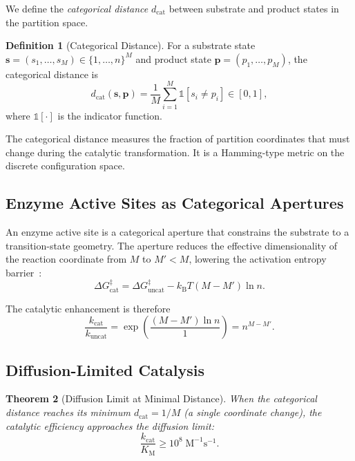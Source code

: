 \documentclass[10pt,twocolumn]{article}
\newtheorem{theorem}{Theorem}[section]
\theoremstyle{definition}
\newtheorem{definition}[theorem]{Definition}
\theoremstyle{remark}
\newcommand{\kB}{k_{\mathrm{B}}}
\newcommand{\dcat}{d_{\mathrm{cat}}}
\newcommand{\kuncat}{k_{\mathrm{uncat}}}
\newcommand{\kcat}{k_{\mathrm{cat}}}
\newcommand{\KM}{K_{\mathrm{M}}}
\begin{document}
We define the \emph{categorical distance} $\dcat$ between
substrate and product states in the partition space.

\begin{definition}[Categorical Distance]\label{def:dcat}
For a substrate state $\mathbf{s} = (s_1, \ldots, s_M) \in
\{1,\ldots,n\}^M$ and product state $\mathbf{p} = (p_1, \ldots, p_M)$,
the categorical distance is
\begin{equation}\label{eq:dcat}
  \dcat(\mathbf{s}, \mathbf{p}) = \frac{1}{M}
  \sum_{i=1}^{M} \mathbb{1}[s_i \neq p_i] \in [0,1],
\end{equation}
where $\mathbb{1}[\cdot]$ is the indicator function.
\end{definition}

The categorical distance measures the fraction of partition
coordinates that must change during the catalytic transformation.
It is a Hamming-type metric on the discrete configuration space.

\subsection{Enzyme Active Sites as Categorical Apertures}

An enzyme active site is a categorical aperture that constrains
the substrate to a transition-state geometry.  The aperture reduces
the effective dimensionality of the reaction coordinate from $M$
to $M' < M$, lowering the activation entropy
barrier~\cite{Wolfenden2001,Klinman2013}:
\begin{equation}
  \Delta G^{\ddagger}_{\text{cat}} =
  \Delta G^{\ddagger}_{\text{uncat}} -
  \kB T (M - M') \ln n.
\end{equation}

The catalytic enhancement is therefore
\begin{equation}
  \frac{\kcat}{\kuncat} = \exp\!\left(\frac{(M - M') \ln n}
  {1}\right) = n^{M - M'}.
\end{equation}

\subsection{Diffusion-Limited Catalysis}

\begin{theorem}[Diffusion Limit at Minimal Distance]\label{thm:diffusion}
When the categorical distance reaches its minimum $\dcat = 1/M$
(a single coordinate change), the catalytic efficiency
approaches the diffusion limit:
\begin{equation}
  \frac{\kcat}{\KM} \geq 10^8 \;\text{M}^{-1}\text{s}^{-1}.
\end{equation}
\end{theorem}
\end{document}
